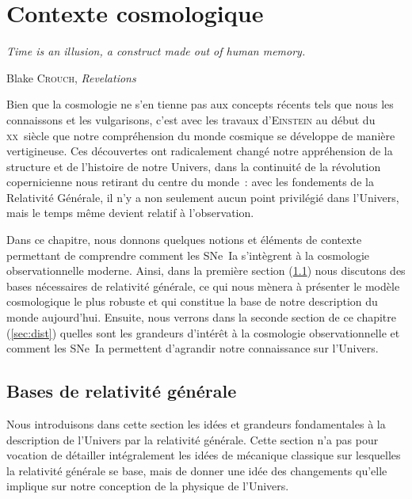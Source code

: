 \documentclass[../main/main.tex]{subfiles}
\begin{document}
\mainmatter


\chapter{Contexte cosmologique}\label{ch:cosmo}

\epigraph{\openquote\textit{Time is an illusion, a construct made out of human
memory.}\closequote}{Blake \textsc{Crouch}, \textit{Revelations}}

Bien que la cosmologie ne s'en tienne pas aux concepts récents tels que nous les
connaissons et les vulgarisons, c'est avec les travaux d'\textsc{Einstein} au
début du \textsc{xx}\ieme~siècle que notre compréhension du monde cosmique se
développe de manière vertigineuse. Ces découvertes ont radicalement changé notre
appréhension de la structure et de l'histoire de notre Univers, dans la
continuité de la révolution copernicienne nous retirant du centre du monde~:
avec les fondements de la Relativité Générale, il n'y a non seulement aucun
point privilégié dans l'Univers, mais le temps même devient relatif à
l'observation.

Dans ce chapitre, nous donnons quelques notions et éléments de contexte
permettant de comprendre comment les SNe~Ia s'intègrent à la cosmologie
observationnelle moderne. Ainsi, dans la première section (\ref{sec:bases}) nous
discutons des bases nécessaires de relativité générale, ce qui nous mènera à
présenter le modèle cosmologique le plus robuste et qui constitue la base de
notre description du monde aujourd'hui. Ensuite, nous verrons dans la seconde
section de ce chapitre (\ref{sec:dist}) quelles sont les grandeurs d'intérêt à
la cosmologie observationnelle et comment les SNe~Ia permettent d'agrandir notre
connaissance sur l'Univers.

\vfill
\minitoc
\vfill

\newpage

\section{Bases de relativité générale}\label{sec:bases}

Nous introduisons dans cette section les idées et grandeurs fondamentales à la
description de l'Univers par la relativité générale. Cette section n'a pas pour
vocation de détailler intégralement les idées de mécanique classique sur
lesquelles la relativité générale se base, mais de donner une idée des
changements qu'elle implique sur notre conception de la physique de l'Univers.
\end{document}
